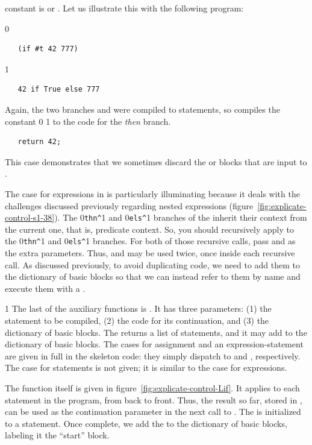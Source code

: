 \documentclass[7x10]{TimesAPriori_MIT}%
\def\racketEd{0}
\def\pythonEd{1}
\providecommand{\BookEdition}{1}
\let\edition\BookEdition
\newcommand{\racket}[1]{{\if\edition\racketEd{#1}\fi}}
\newcommand{\pythonColor}[0]{}
\newcommand{\python}[1]{{\if\edition\pythonEd\pythonColor #1\fi}}
\numberwithin{theorem}{chapter}
\numberwithin{definition}{chapter}
\numberwithin{equation}{chapter}
\begin{document}
constant is \TRUE{} or \FALSE{}. Let us illustrate this with the
following program:
{\if\edition\racketEd
\begin{lstlisting}
   (if #t 42 777)
\end{lstlisting}
\fi}
{\if\edition\pythonEd\pythonColor
\begin{lstlisting}
   42 if True else 777
\end{lstlisting}
\fi}
%
\noindent Again, the two branches  and  were
compiled to  statements, so 
compiles the constant \racket{} \python{} to the
code for the \emph{then} branch.
\begin{lstlisting}
   return 42;
\end{lstlisting}
This case demonstrates that we sometimes discard the  or
 blocks that are input to .

The case for  expressions in  is
particularly illuminating because it deals with the challenges
discussed previously regarding nested  expressions
(figure~\ref{fig:explicate-control-s1-38}).  The
\racket{\lstinline{thn^}}\python{} and
\racket{\lstinline{els^}}\python{} branches of the
 inherit their context from the current one, that is,
predicate context. So, you should recursively apply
 to the
\racket{\lstinline{thn^}}\python{} and
\racket{\lstinline{els^}}\python{} branches. For both of
those recursive calls, pass  and  as the extra
parameters. Thus,  and  may be used twice, once
inside each recursive call. As discussed previously, to avoid
duplicating code, we need to add them to the dictionary of basic
blocks so that we can instead refer to them by name and execute them
with a .

{\if\edition\pythonEd\pythonColor
%
The last of the auxiliary functions is .  It has
three parameters: (1) the statement to be compiled, (2) the code for its
continuation, and (3) the dictionary of basic blocks. The
 returns a list of statements, and it may add to
the dictionary of basic blocks. The cases for assignment and an
expression-statement are given in full in the skeleton code: they
simply dispatch to  and
, respectively. The case for 
statements is not given; it is similar to the case for 
expressions.

The  function itself is given in
figure~\ref{fig:explicate-control-Lif}. It applies
 to each statement in the program, from back to
front. Thus, the result so far, stored in , can be
used as the continuation parameter in the next call to
. The  is initialized to a
 statement. Once complete, we add the  to
the dictionary of basic blocks, labeling it the ``start'' block.
%
\fi}
\end{document}
